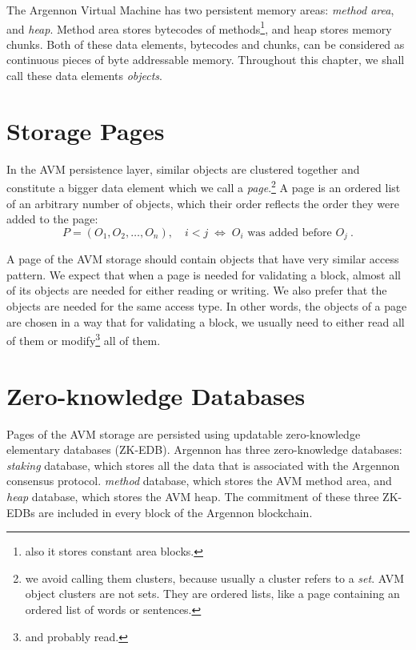 
The Argennon Virtual Machine has two persistent memory areas: \emph{method area}, and \emph{heap}. Method area stores
bytecodes of methods\footnote{also it stores constant area blocks.}, and heap stores memory chunks. Both of these
data elements, bytecodes and chunks, can be considered as continuous pieces of byte addressable memory. Throughout this
chapter, we shall call these data elements \emph{objects}.


\section{Storage Pages}\label{sec:storage-pages}

In the AVM persistence layer, similar objects are clustered together and constitute a bigger data element which we call
a \emph{page}.\footnote{we avoid calling them clusters, because usually a cluster refers to a \emph{set}. AVM object
clusters are not sets. They are ordered lists, like a page containing an ordered list of words or sentences.}
A page is an ordered list of an arbitrary number of objects, which their order reflects the order they were added to
the page:
\[
    P = (O_1,O_2,\dots,O_n),\quad i < j \; \Leftrightarrow \; \textrm{$O_i$ was added before $O_j$}\ .
\]

A page of the AVM storage should contain objects that have very similar access pattern. We expect that when a page
is needed for validating a block, almost all of its objects are needed for either reading or writing. We also prefer
that the objects are needed for the same access type. In other words, the objects of a page are chosen in a way that
for validating a block, we usually need to either read all of them or modify\footnote{and probably read.} all of them.

\section{Zero-knowledge Databases}\label{sec:zk-edb}

Pages of the AVM storage are persisted using updatable zero-knowledge elementary databases (ZK-EDB). Argennon
has three zero-knowledge databases: \emph{staking} database, which stores all the data that is associated with
the Argennon consensus protocol. \emph{method} database, which stores the AVM method area, and \emph{heap} database,
which stores the AVM heap. The commitment of these three ZK-EDBs are included in every block of the Argennon blockchain.

